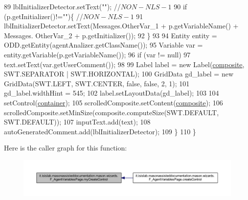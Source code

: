 \begin{DoxyCode}
89             lblInitializerDetector.setText(\textcolor{stringliteral}{""}); \textcolor{comment}{//$NON-NLS-1$}
90             \textcolor{keywordflow}{if} (p.getInitializer()!=\textcolor{stringliteral}{""})\{ \textcolor{comment}{//$NON-NLS-1$}
91                 lblInitializerDetector.setText(Messages.OtherVar\_1 + p.getVariableName() + Messages.
      OtherVar\_2 + p.getInitializer());
92             \}
93             
94             Entity entity = ODD.getEntity(agentAnalizer.getClassName());
95             Variable var = entity.getVariable(p.getVariableName());
96             \textcolor{keywordflow}{if} (var != null)
97                 text.setText(var.getUserComment());
98             
99             Label label = \textcolor{keyword}{new} Label(\hyperlink{classit_1_1isislab_1_1masonassisteddocumentation_1_1mason_1_1wizards_1_1_f___agent_variables_page_ae1c0cb2824f39253ba724603c4ba6920}{composite}, SWT.SEPARATOR | SWT.HORIZONTAL);
100             GridData gd\_label = \textcolor{keyword}{new} GridData(SWT.LEFT, SWT.CENTER, \textcolor{keyword}{false}, \textcolor{keyword}{false}, 2, 1);
101             gd\_label.widthHint = 545;
102             label.setLayoutData(gd\_label);
103             
104             setControl(\hyperlink{classit_1_1isislab_1_1masonassisteddocumentation_1_1mason_1_1wizards_1_1_f___agent_variables_page_a69defe28748ba6ba72b8c09e3b213245}{container});
105             scrolledComposite.setContent(\hyperlink{classit_1_1isislab_1_1masonassisteddocumentation_1_1mason_1_1wizards_1_1_f___agent_variables_page_ae1c0cb2824f39253ba724603c4ba6920}{composite});
106             scrolledComposite.setMinSize(composite.computeSize(SWT.DEFAULT, SWT.DEFAULT));  
107             inputText.add(text);
108             autoGeneratedComment.add(lblInitializerDetector);
109         \}
110     \}
\end{DoxyCode}


Here is the caller graph for this function\-:\nopagebreak
\begin{figure}[H]
\begin{center}
\leavevmode
\includegraphics[width=350pt]{classit_1_1isislab_1_1masonassisteddocumentation_1_1mason_1_1wizards_1_1_f___agent_variables_page_a275d67efa29411a7afc3ee12531b4f3b_icgraph}
\end{center}
\end{figure}




